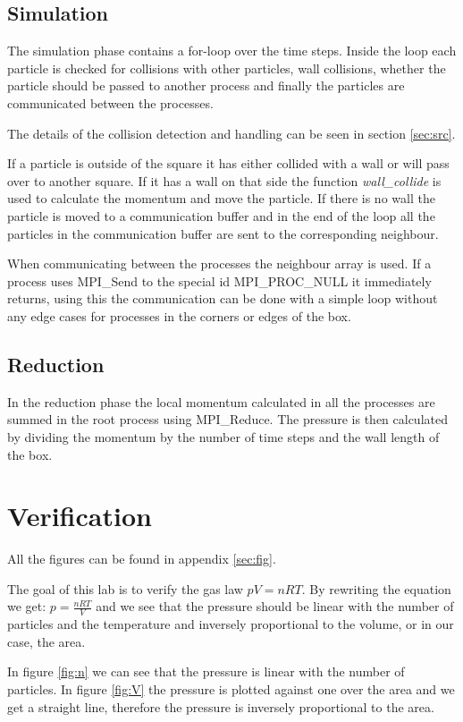 \documentclass[a4paper, 12pt]{article}
\begin{document}
\subsection{Simulation}
The simulation phase contains a for-loop over the time steps. Inside the loop
each particle is checked for collisions with other particles, wall collisions,
whether the particle should be passed to another process and finally the
particles are communicated between the processes.

The details of the collision detection and handling can be seen in section
\ref{sec:src}.

If a particle is outside of the square it has either collided with a wall or
will pass over to another square. If it has a wall on that side the function
\textit{wall\_collide} is used to calculate the momentum and move the particle.
If there is no wall the particle is moved to a communication buffer and in the
end of the loop all the particles in the communication buffer are sent to the
corresponding neighbour.

When communicating between the processes the neighbour array is used. If a
process uses MPI\_Send to the special id MPI\_PROC\_NULL it immediately returns,
using this the communication can be done with a simple loop without any edge cases
for processes in the corners or edges of the box.

\subsection{Reduction}
In the reduction phase the local momentum calculated in all the processes are
summed in the root process using MPI\_Reduce. The pressure is then calculated
by dividing the momentum by the number of time steps and the wall length of the
box.

\section{Verification}
All the figures can be found in appendix \ref{sec:fig}.

The goal of this lab is to verify the gas law $pV = nRT$.
By rewriting the equation we get: $p = \frac{nRT}{V}$ and we see that the
pressure should be linear with the number of particles and the temperature and
inversely proportional to the volume, or in our case, the area.

In figure \ref{fig:n} we can see that the pressure is linear with the number of
particles. In figure \ref{fig:V} the pressure is plotted against one over the
area and we get a straight line, therefore the pressure is inversely
proportional to the area.
\end{document}
